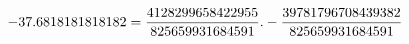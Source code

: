 \documentclass[preview]{standalone}
\begin{document}
\begin{align*}
\special{dvisvgm:raw <g id='unique000'>}-37.6818181818182 = \frac{4128299658422955}{825659931684591}. - \frac{39781796708439382}{825659931684591}\special{dvisvgm:raw </g>}
\end{align*}
\end{document}

